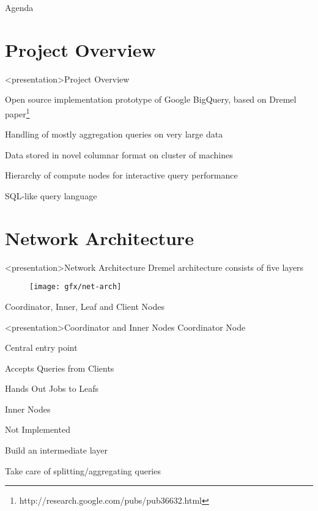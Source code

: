 \begin{frame}[t,plain]
\titlepage
\end{frame}

\begin{frame}[t,plain]{Agenda}
\tableofcontents
\end{frame}

\section{Project Overview}

\begin{frame}<presentation>{Project Overview}
\begin{niitemize}
 \item Open source implementation prototype of Google BigQuery, based on Dremel
   paper\footnote{http://research.google.com/pubs/pub36632.html}
 \item Handling of mostly aggregation queries on very large data
 \item Data stored in novel columnar format on cluster of machines
 \item Hierarchy of compute nodes for interactive query performance
 \item SQL-like query language
\end{niitemize}
\end{frame}


\section{Network Architecture}
\begin{frame}<presentation>{Network Architecture}
  Dremel architecture consists of five layers
  \begin{figure}
    \centering
    \texttt{[image: gfx/net-arch]}
  \end{figure}
  Coordinator, Inner, Leaf and Client Nodes
\end{frame}

\begin{frame}<presentation>{Coordinator and Inner Nodes}
  Coordinator Node
  \begin{niitemize}
    \item Central entry point
    \item Accepts Queries from Clients
    \item Hands Out Jobs to Leafs
  \end{niitemize}
  Inner Nodes
  \begin{niitemize}
    \item Not Implemented
    \item Build an intermediate layer
    \item Take care of splitting/aggregating queries
  \end{niitemize}
\end{frame}


